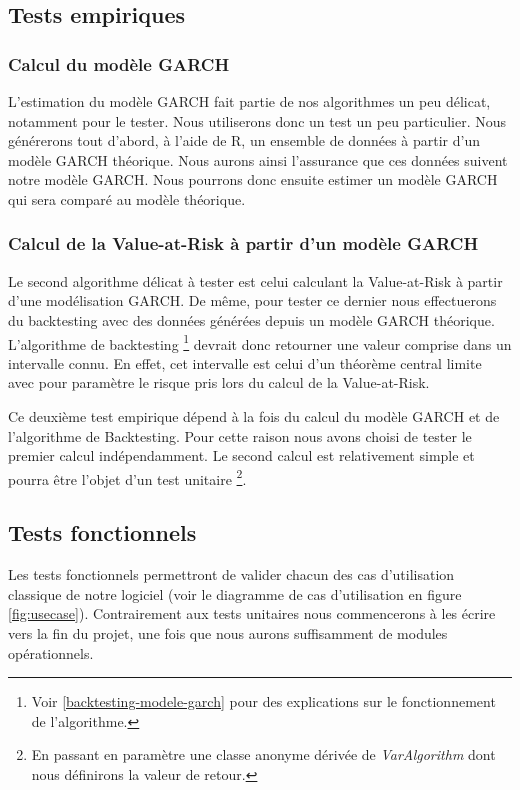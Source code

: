 \documentclass[a4paper,titlepage,french]{report}
\begin{document}
\subsection{Tests empiriques}

\subsubsection{Calcul du modèle GARCH}

L'estimation du modèle GARCH fait partie de nos algorithmes un peu délicat, notamment pour le tester.
Nous utiliserons donc un test un peu particulier.
Nous générerons tout d'abord, à l'aide de R, un ensemble de données à partir d'un modèle GARCH théorique.
Nous aurons ainsi l'assurance que ces données suivent notre modèle GARCH.
Nous pourrons donc ensuite estimer un modèle GARCH qui sera comparé au modèle théorique.

\subsubsection{Calcul de la Value-at-Risk à partir d'un modèle GARCH}

Le second algorithme délicat à tester est celui calculant la Value-at-Risk à partir d'une modélisation GARCH.
De même, pour tester ce dernier nous effectuerons du backtesting avec des données générées depuis un modèle GARCH théorique.
L'algorithme de backtesting \footnote{Voir \ref{backtesting-modele-garch} pour des explications sur le fonctionnement de l'algorithme.} devrait donc retourner une valeur comprise dans un intervalle connu. 
En effet, cet intervalle est celui d'un théorème central limite avec pour paramètre le risque pris lors du calcul de la Value-at-Risk.

Ce deuxième test empirique dépend à la fois du calcul du modèle GARCH et de l'algorithme de Backtesting. Pour cette raison nous avons choisi de tester le premier calcul indépendamment. Le second calcul est relativement simple et pourra être l'objet d'un test unitaire \footnote{En passant en paramètre une classe anonyme dérivée de \textit{VarAlgorithm} dont nous définirons la valeur de retour.}.


\subsection{Tests fonctionnels}

Les tests fonctionnels permettront de valider chacun des cas d'utilisation classique de notre logiciel (voir le diagramme de cas d'utilisation en figure \ref{fig:usecase}).
Contrairement aux tests unitaires nous commencerons à les écrire vers la fin du projet, une fois que nous aurons suffisamment de modules opérationnels.
\end{document}
